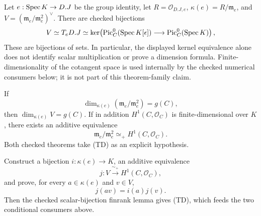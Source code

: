 \begin{theorem}
  \label{route-thm-tangent-interface}
  \leanok

  Let \(e:\operatorname{Spec} K\to D.J\) be the group identity, let
  \(R=\mathcal O_{D.J,e}\), \(\kappa(e)=R/\mathfrak m_e\), and
  \(V=(\mathfrak m_e/\mathfrak m_e^2)^\vee\).  There are checked bijections
  \[
    V\simeq T_eD.J\simeq
    \ker\!\left(
      \operatorname{Pic}^0_C(\operatorname{Spec} K[\epsilon])\longrightarrow
      \operatorname{Pic}^0_C(\operatorname{Spec} K)\right),
  \]
  These are bijections of sets.  In particular, the displayed kernel
  equivalence alone does not identify scalar multiplication or prove a
  dimension formula.  Finite-dimensionality of the cotangent space is used
  internally by the checked numerical consumers below; it is not part of this
  theorem-family claim.
\end{theorem}

\begin{theorem}
  \label{route-thm-tangent-conditional}
  \leanok

  If
  \[
    \dim_{\kappa(e)}(\mathfrak m_e/\mathfrak m_e^2)=g(C),
    \tag{TD}
  \]
  then \(\dim_{\kappa(e)}V=g(C)\).  If in addition
  \(H^1(C,\mathcal O_C)\) is finite-dimensional over \(K\), there exists an
  additive equivalence
  \[
    \mathfrak m_e/\mathfrak m_e^2\simeq_+
      H^1(C,\mathcal O_C).
  \]
  Both checked theorems take (TD) as an explicit hypothesis.
\end{theorem}

\begin{theorem}
  \label{route-thm-tangent-semilinear}
  \notready

  Construct a bijection \(i:\kappa(e)\to K\), an additive equivalence
  \[
    j:V\xrightarrow{\sim_+}H^1(C,\mathcal O_C),
  \]
  and prove, for every \(a\in\kappa(e)\) and \(v\in V\),
  \[
    j(a v)=i(a)j(v).
    \tag{SL}
  \]
  Then the checked scalar-bijection finrank lemma gives (TD), which feeds the
  two conditional consumers above.
\end{theorem}

